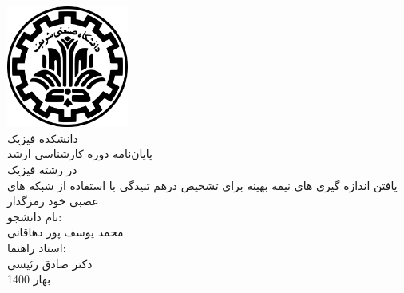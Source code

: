 \pagestyle{empty}
\begin{center}
\includegraphics[width=0.3\textwidth]{files/logo.png}\\
\Nastaliq
\large{دانشکده فیزیک}\\\vspace{1cm}
\titlefont
\large{ پایان‌نامه دوره کارشناسی ارشد}\\
\large{در رشته فیزیک}\\
\vspace{1cm}
\Large{یافتن اندازه گیری های نیمه بهینه برای تشخیص درهم تنیدگی با استفاده از شبکه های عصبی خود رمزگذار}\\\vspace{2cm}
\normalsize{نام دانشجو:}\\
\large{محمد یوسف پور دهاقانی}\\\vspace{2cm}
\normalsize{استاد راهنما:}\\
\large{دکتر صادق رئیسی}\\\vspace{2cm}
\normalsize{بهار 1400}

\end{center}
\newpage\null\newpage
